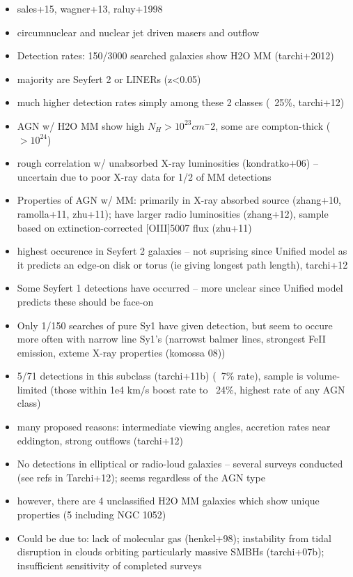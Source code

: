 \begin{itemize}
\item sales+15, wagner+13, raluy+1998
\item circumnuclear and nuclear jet driven masers and outflow
\item Detection rates: 150/3000 searched galaxies show H2O MM (tarchi+2012)
\item majority are Seyfert 2 or LINERs (z<0.05)
\item much higher detection rates simply among these 2 classes (~25\%, tarchi+12)
\item AGN w/ H2O MM show high $N_H > 10^23 cm^-2$, some are compton-thick ($>10^24$)
\item rough correlation w/ unabsorbed X-ray luminosities (kondratko+06) -- uncertain due to poor X-ray data for 1/2 of MM detections
\item Properties of AGN w/ MM: primarily in X-ray absorbed source (zhang+10, ramolla+11, zhu+11); have larger radio luminosities (zhang+12), sample based on extinction-corrected [OIII]5007 flux (zhu+11)
\item highest occurence in Seyfert 2 galaxies -- not suprising since Unified model as it predicts an edge-on disk or torus (ie giving longest path length), tarchi+12
\item Some Seyfert 1 detections have occurred -- more unclear since Unified model predicts these should be face-on
\item Only 1/150 searches of pure Sy1 have given detection, but seem to occure more often with narrow line Sy1's (narrowst balmer lines, strongest FeII emission, exteme X-ray properties (komossa 08))
\item 5/71 detections in this subclass (tarchi+11b) (~7\% rate), sample is volume-limited (those within 1e4 km/s boost rate to ~24\%, highest rate of any AGN class)
\item many proposed reasons: intermediate viewing angles, accretion rates near eddington, strong outflows (tarchi+12)
\item No detections in elliptical or radio-loud galaxies -- several surveys conducted (see refs in Tarchi+12); seems regardless of the AGN type
\item however, there are 4 unclassified H2O MM galaxies which show unique properties (5 including NGC 1052)
\item Could be due to: lack of molecular gas (henkel+98); instability from tidal disruption in clouds orbiting particularly massive SMBHs (tarchi+07b); insufficient sensitivity of completed surveys
\end{itemize}

